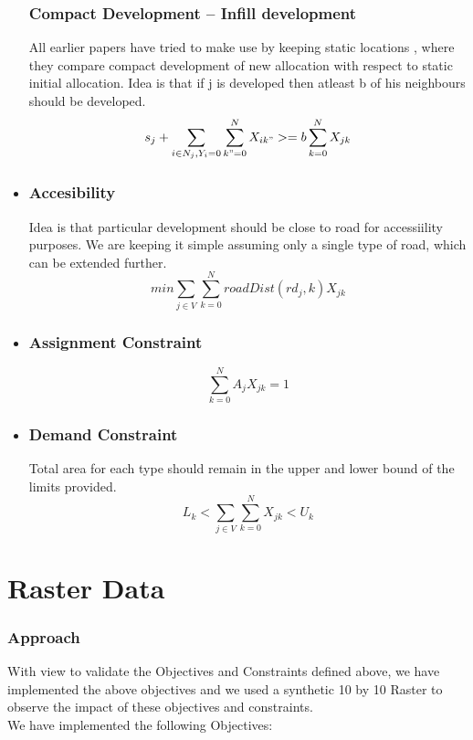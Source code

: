 \documentclass[twoside,10pt]{article}
\begin{document}
\begin{itemize}
\subsubsection*{Compact Development -- Infill development}
All earlier papers have tried to make use by keeping static locations , where they compare compact development of new allocation with respect to static initial allocation.
Idea is that if j is developed then atleast b of his neighbours should be developed.
$$
s_j +\sum_{i \in N_j, Y_{i} =0 } \sum_{k"=0}^N X_{ik"} >= b \sum_{k=0}^N X_{jk}
 $$
\item
\subsubsection*{Accesibility  }
Idea is that particular development should be close to road for accessiility purposes. We are keeping it simple assuming only a single type of road, which can be extended further.
 $$
 min\sum_{j \in V} \sum_{k=0}^N roadDist(rd_j,k)X_{jk}
 $$

\item
\subsubsection*{Assignment Constraint}
$$\sum_{k=0}^N A_j X_{jk} =1$$

\item
\subsubsection*{Demand Constraint  }
 Total area for each type should remain in the upper and lower bound of the limits provided.
$$ L_k < \sum_{j \in V} \sum_{k=0}^N X_{jk} < U_k $$
\end{itemize}


\section{Raster Data}
\subsubsection*{Approach }

With view to validate the Objectives and Constraints defined above, we have implemented the above objectives and we used a synthetic 10 by 10 Raster to observe the impact  of these objectives and constraints.\\[.25cm]

We have implemented the following Objectives:
\end{document}
